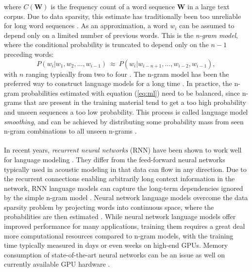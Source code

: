 \documentclass[english, 12pt, a4paper, pdftex, elec, utf8]{aaltothesis}
\begin{document}
where $C(\bm{W})$ is the frequency count of a word sequence $\bm{W}$ in a large text corpus. Due to data sparsity, this estimate has traditionally been too unreliable for long word sequences \cite{gales2008application}. As an approximation, a word $w_i$ can be assumed to depend only on a limited number of previous words. This is the \textit{n-gram model}, where the conditional probability is truncated to depend only on the $n-1$ preceding words:
\begin{equation}
P(w_i|w_1,w_2,\dots,w_{i-1}) \ \approx \ P(w_i|w_{i-n+1},\dots,w_{i-2},w_{i-1}),
\end{equation}
with $n$ ranging typically from two to four \cite[p.~210]{gales2008application}. The n-gram model has been the preferred way to construct language models for a long time \cite{gales2008application, kallasjoki2016, hirsimaki2009importance}. In practice, the n-gram probabilities estimated with equation (\ref{eq:ml}) need to be balanced, since n-grams that are present in the training material tend to get a too high probability and unseen sequences a too low probability. This process is called language model \textit{smoothing}, and can be achieved by distributing some probability mass from seen n-gram combinations to all unseen n-grams \cite{gales2008application}. \\\\
In recent years, \textit{recurrent neural networks} (RNN) have been shown to work well for language modeling \cite{enarvi2017automatic}. They differ from the feed-forward neural networks typically used in acoustic modeling in that data can flow in any direction. Due to the recurrent connections enabling arbitrarily long context information in the network, RNN language models can capture the long-term dependencies ignored by the simple n-gram model \cite{enarvi2017automatic, mansikkaniemi2017continuous}. Neural network language models overcome the data sparsity problem by projecting words into continuous space, where the probabilities are then estimated \cite{mansikkaniemi2017continuous}. While neural network language models offer improved performance for many applications, training them requires a great deal more computational resources compared to n-gram models, with the training time typically measured in days or even weeks on high-end GPUs. Memory consumption of state-of-the-art neural networks can be an issue as well on currently available GPU hardware \cite{enarvi2017automatic}. \\\\
\end{document}
